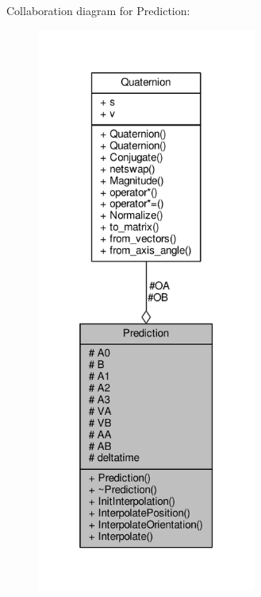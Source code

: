Collaboration diagram for Prediction\+:
\nopagebreak
\begin{figure}[H]
\begin{center}
\leavevmode
\includegraphics[width=205pt]{d9/dd9/classPrediction__coll__graph}
\end{center}
\end{figure}
